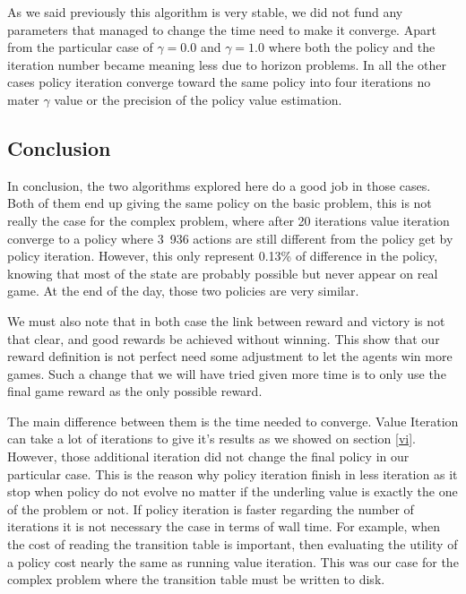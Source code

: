 \documentclass[twocolumn,a4paper,10pt]{article}
\begin{document}
As we said previously this algorithm is very stable, we did not fund
any parameters that managed to change the time need to make it converge.
Apart from the particular case of $\gamma=0.0$ and $\gamma=1.0$
where both the policy and the iteration number became
meaning less due to horizon problems. In all the other cases policy
iteration converge toward the same policy into four iterations no
mater $\gamma$ value or the precision of the policy value estimation.

\subsection{Conclusion}


In conclusion, the two algorithms explored here do a good job in those
cases. Both of them end up giving the same policy on the basic problem,
this is not really the case for the complex problem, where after 20
iterations value iteration converge to a policy where 3~936 actions
are still different from the policy get by policy iteration. However,
this only represent 0.13\% of difference in the policy, knowing that
most of the state are probably possible but never appear on real game.
At the end of the day, those two policies are very similar.

We must also note that in both case the link between reward and victory
is not that clear, and good rewards be achieved without winning. This
show that our reward definition is not perfect need some adjustment
to let the agents win more games. Such a change that we will have
tried given more time is to only use the final game reward as the
only possible reward.

The main difference between them is the time needed to converge. Value
Iteration can take a lot of iterations to give it's results as we
showed on section \ref{vi}. However, those additional iteration did
not change the final policy in our particular case. This is the reason
why policy iteration finish in less iteration as it stop when policy
do not evolve no matter if the underling value is exactly the one
of the problem or not. If policy iteration is faster regarding the
number of iterations it is not necessary the case in terms of wall
time. For example, when the cost of reading the transition table is
important, then evaluating the utility of a policy cost nearly the
same as running value iteration. This was our case for the complex
problem where the transition table must be written to disk.
\end{document}
